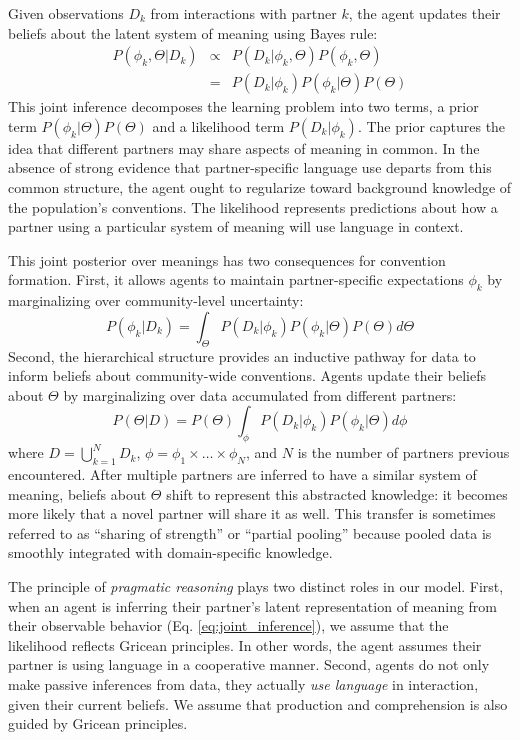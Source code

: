 Given observations $D_k$ from interactions with partner $k$, the agent updates their beliefs about the latent system of meaning using Bayes rule:
\begin{equation}
\begin{array}{rcl}
\label{eq:joint_inference}
P(\phi_k, \Theta | D_k)  & \propto &  P(D_k | \phi_k, \Theta) P(\phi_k, \Theta) \\
                           & =   & P(D_k | \phi_k) P(\phi_k | \Theta) P(\Theta)
\end{array}
\end{equation}
This joint inference decomposes the learning problem into two terms, a prior term $P(\phi_k | \Theta)P(\Theta)$ and a likelihood term $P(D_k | \phi_k)$.
The prior captures the idea that different partners may share aspects of meaning in common.
In the absence of strong evidence that partner-specific language use departs from this common structure, the agent ought to regularize toward background knowledge of the population's conventions.
The likelihood represents predictions about how a partner using a particular system of meaning will use language in context.

This joint posterior over meanings has two consequences for convention formation.
First, it allows agents to maintain partner-specific expectations $\phi_k$ by marginalizing over community-level uncertainty:
\begin{equation}
P(\phi_k | D_k) = \int_{\Theta}P(D_k | \phi_k) P(\phi_k | \Theta) P(\Theta)  d\Theta
\end{equation}
Second, the hierarchical structure provides an inductive pathway for data to inform beliefs about community-wide conventions.
Agents update their beliefs about $\Theta$ by marginalizing over data accumulated from different partners:
\begin{equation}
P(\Theta | D) = P(\Theta) \int_{\phi} P(D_k | \phi_k) P(\phi_k | \Theta) d\phi
\end{equation}
where $D = \bigcup_{k=1}^N D_k$, $\phi = \phi_1 \times \dots \times \phi_N$, and $N$ is the number of partners previous encountered. 
After multiple partners are inferred to have a similar system of meaning, beliefs about $\Theta$ shift to represent this abstracted knowledge: it becomes more likely that a novel partner will share it as well.
This transfer is sometimes referred to as ``sharing of strength'' or ``partial pooling'' because pooled data is smoothly integrated with domain-specific knowledge.

The principle of \textit{pragmatic reasoning} plays two distinct roles in our model.
First, when an agent is inferring their partner's latent representation of meaning from their observable behavior (Eq. \ref{eq:joint_inference}), we assume that the likelihood reflects Gricean principles.
In other words, the agent assumes their partner is using language in a cooperative manner.
Second, agents do not only make passive inferences from data, they actually \emph{use language} in interaction, given their current beliefs.
We assume that production and comprehension is also guided by Gricean principles.

